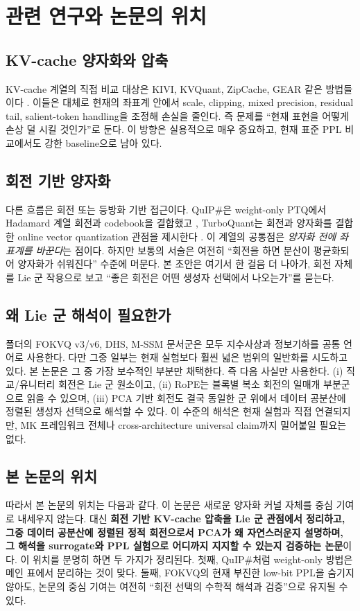 \section{관련 연구와 논문의 위치}

\subsection{KV-cache 양자화와 압축}

KV-cache 계열의 직접 비교 대상은 KIVI, KVQuant, ZipCache, GEAR 같은 방법들이다 \citep{liu2024kivi,hooper2024kvquant,he2024zipcache,kang2024gear}. 이들은 대체로 현재의 좌표계 안에서 scale, clipping, mixed precision, residual tail, salient-token handling을 조정해 손실을 줄인다. 즉 문제를 ``현재 표현을 어떻게 손상 덜 시킬 것인가''로 둔다. 이 방향은 실용적으로 매우 중요하고, 현재 표준 PPL 비교에서도 강한 baseline으로 남아 있다.

\subsection{회전 기반 양자화}

다른 흐름은 회전 또는 등방화 기반 접근이다. QuIP\#은 weight-only PTQ에서 Hadamard 계열 회전과 codebook을 결합했고 \citep{tseng2024quipsharp}, TurboQuant는 회전과 양자화를 결합한 online vector quantization 관점을 제시한다 \citep{zandieh2025turboquant}. 이 계열의 공통점은 \emph{양자화 전에 좌표계를 바꾼다}는 점이다. 하지만 보통의 서술은 여전히 ``회전을 하면 분산이 평균화되어 양자화가 쉬워진다'' 수준에 머문다. 본 초안은 여기서 한 걸음 더 나아가, 회전 자체를 Lie 군 작용으로 보고 ``좋은 회전은 어떤 생성자 선택에서 나오는가''를 묻는다.

\subsection{왜 Lie 군 해석이 필요한가}

폴더의 FOKVQ v3/v6, DHS, M-SSM 문서군은 모두 지수사상과 정보기하를 공통 언어로 사용한다. 다만 그중 일부는 현재 실험보다 훨씬 넓은 범위의 일반화를 시도하고 있다. 본 논문은 그 중 가장 보수적인 부분만 채택한다. 즉 다음 사실만 사용한다. (i) 직교/유니터리 회전은 Lie 군 원소이고, (ii) RoPE는 블록별 복소 회전의 일매개 부분군으로 읽을 수 있으며, (iii) PCA 기반 회전도 결국 동일한 군 위에서 데이터 공분산에 정렬된 생성자 선택으로 해석할 수 있다. 이 수준의 해석은 현재 실험과 직접 연결되지만, MK 프레임워크 전체나 cross-architecture universal claim까지 밀어붙일 필요는 없다.

\subsection{본 논문의 위치}

따라서 본 논문의 위치는 다음과 같다. 이 논문은 새로운 양자화 커널 자체를 중심 기여로 내세우지 않는다. 대신 \textbf{회전 기반 KV-cache 압축을 Lie 군 관점에서 정리하고, 그중 데이터 공분산에 정렬된 정적 회전으로서 PCA가 왜 자연스러운지 설명하며, 그 해석을 surrogate와 PPL 실험으로 어디까지 지지할 수 있는지 검증하는 논문}이다. 이 위치를 분명히 하면 두 가지가 정리된다. 첫째, QuIP\#처럼 weight-only 방법은 메인 표에서 분리하는 것이 맞다. 둘째, FOKVQ의 현재 부진한 low-bit PPL을 숨기지 않아도, 논문의 중심 기여는 여전히 ``회전 선택의 수학적 해석과 검증''으로 유지될 수 있다.
